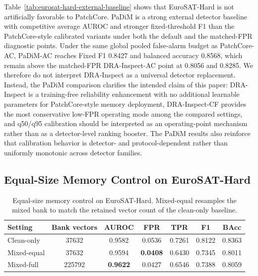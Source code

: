 \documentclass[remotesensing,article,submit,pdftex,moreauthors]{Definitions/mdpi}
\begin{document}
\noindent Table~\ref{tab:eurosat-hard-external-baseline} shows that EuroSAT-Hard is not artificially favorable to PatchCore. PaDiM is a strong external detector baseline with competitive average AUROC and stronger fixed-threshold F1 than the PatchCore-style calibrated variants under both the default and the matched-FPR diagnostic points. Under the same global pooled false-alarm budget as PatchCore-AC, PaDiM-AC reaches Fixed F1 0.8427 and balanced accuracy 0.8568, which remain above the matched-FPR DRA-Inspect-AC point at 0.8056 and 0.8285. We therefore do not interpret DRA-Inspect as a universal detector replacement. Instead, the PaDiM comparison clarifies the intended claim of this paper: DRA-Inspect is a training-free reliability enhancement with no additional learnable parameters for PatchCore-style memory deployment, DRA-Inspect-CF provides the most conservative low-FPR operating mode among the compared settings, and q50/q95 calibration should be interpreted as an operating-point mechanism rather than as a detector-level ranking booster. The PaDiM results also reinforce that calibration behavior is detector- and protocol-dependent rather than uniformly monotonic across detector families.

\subsection{Equal-Size Memory Control on EuroSAT-Hard}

\begin{table}[!htbp]
\caption{Equal-size memory control on EuroSAT-Hard. Mixed-equal resamples the mixed bank to match the retained vector count of the clean-only baseline.}
\label{tab:eurosat-hard-equal-size}
\centering
\small
\setlength{\tabcolsep}{4pt}
\begin{tabular}{lcccccc}
\hline
Setting & Bank vectors & AUROC & FPR & TPR & F1 & BAcc \\
\hline
Clean-only & 37632 & 0.9582 & 0.0536 & 0.7261 & 0.8122 & 0.8363 \\
Mixed-equal & 37632 & 0.9594 & \textbf{0.0408} & 0.6430 & 0.7345 & 0.8011 \\
Mixed-full & 225792 & \textbf{0.9622} & 0.0427 & 0.6546 & 0.7388 & 0.8059 \\
\hline
\end{tabular}
\end{table}
\end{document}
